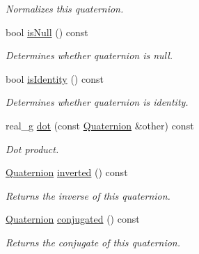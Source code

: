 \begin{Indent}
\begin{DoxyCompactItemize}
\begin{DoxyCompactList}\small\item\em Normalizes this quaternion. \end{DoxyCompactList}\item 
\mbox{\label{classrev_1_1_quaternion_a5f7fdde8c7f947c438313743590163c8}} 
bool \mbox{\hyperlink{classrev_1_1_quaternion_a5f7fdde8c7f947c438313743590163c8}{is\+Null}} () const
\begin{DoxyCompactList}\small\item\em Determines whether quaternion is null. \end{DoxyCompactList}\item 
\mbox{\label{classrev_1_1_quaternion_a97ec441eea21bb87631fcbe7d5c5c045}} 
bool \mbox{\hyperlink{classrev_1_1_quaternion_a97ec441eea21bb87631fcbe7d5c5c045}{is\+Identity}} () const
\begin{DoxyCompactList}\small\item\em Determines whether quaternion is identity. \end{DoxyCompactList}\item 
real\+\_\+g \mbox{\hyperlink{classrev_1_1_quaternion_a3a048d2bc01cf013dfad568dab996e06}{dot}} (const \mbox{\hyperlink{classrev_1_1_quaternion}{Quaternion}} \&other) const
\begin{DoxyCompactList}\small\item\em Dot product. \end{DoxyCompactList}\item 
\mbox{\label{classrev_1_1_quaternion_a318f5fae64b1695a734b8a180edb5b4f}} 
\mbox{\hyperlink{classrev_1_1_quaternion}{Quaternion}} \mbox{\hyperlink{classrev_1_1_quaternion_a318f5fae64b1695a734b8a180edb5b4f}{inverted}} () const
\begin{DoxyCompactList}\small\item\em Returns the inverse of this quaternion. \end{DoxyCompactList}\item 
\mbox{\label{classrev_1_1_quaternion_a470ab6146f801f4b5b23405b10392989}} 
\mbox{\hyperlink{classrev_1_1_quaternion}{Quaternion}} \mbox{\hyperlink{classrev_1_1_quaternion_a470ab6146f801f4b5b23405b10392989}{conjugated}} () const
\begin{DoxyCompactList}\small\item\em Returns the conjugate of this quaternion. \end{DoxyCompactList}\item 

\end{DoxyCompactItemize}
\end{Indent}

